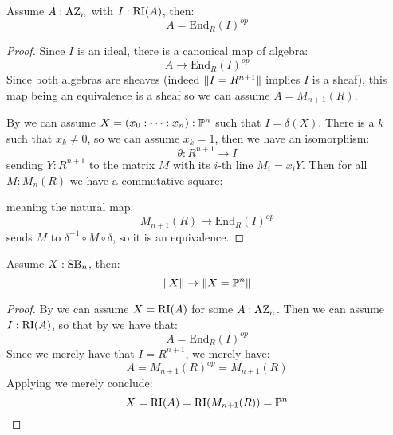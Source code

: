 \begin{lemma}\label{azumaya-with-right-ideal}
Assume $A:\mathrm{AZ}_n$ with $I:\mathrm{RI}(A)$, then:
\[A = \mathrm{End}_R(I)^{op}\]
\end{lemma}

\begin{proof}
Since $I$ is an ideal, there is a canonical map of algebra:
\[A \to\mathrm{End}_R(I)^{op}\]
Since both algebras are sheaves (indeed $\lVert I=R^{n+1} \rVert$ implies $I$ is a sheaf), this map being an equivalence is a sheaf so we can assume $A=M_{n+1}(R)$.

By  we can assume $X=(x_0:\cdots:x_n):\mathbb{P}^n$ such that $I=\delta(X)$. There is a $k$ such that $x_k\not=0$, so we can assume $x_k=1$, then we have an isomorphism:
\[\theta:R^{n+1}\to I\]
sending $Y:R^{n+1}$ to the matrix $M$ with its $i$-th line $M_i=x_iY$. Then for all $M:M_n(R)$ we have a commutative square:
\begin{center}
\end{center}
meaning the natural map:
\[ M_{n+1}(R)\to \mathrm{End}_R(I)^{op}\]
sends $M$ to $\delta^{-1}\circ M\circ\delta$, so it is an equivalence.
\end{proof}

\begin{theorem}\label{chatelet-theorem}
Assume $X:\mathrm{SB}_n$, then:
\[\lVert X \rVert\to\lVert X=\mathbb{P}^n \rVert\]
\end{theorem}

\begin{proof}
By  we can assume $X=\mathrm{RI}(A)$ for some $A:\mathrm{AZ}_n$. Then we can assume $I:\mathrm{RI}(A)$, so that by  we have that:
\[A=\mathrm{End}_R(I)^{op}\]
Since we merely have that $I=R^{n+1}$, we merely have:
\[A = M_{n+1}(R)^{op} = M_{n+1}(R)\]
Applying  we merely conclude:
\[X=\mathrm{RI}(A)=\mathrm{RI}(M_{n+1}(R)) = \mathbb{P}^n\]
\end{proof}